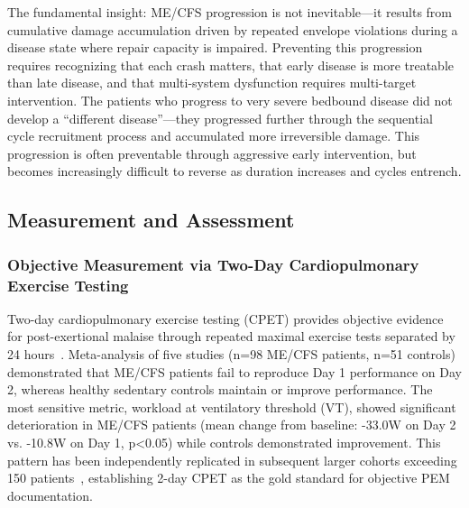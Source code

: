 The fundamental insight: ME/CFS progression is not inevitable---it results from cumulative damage accumulation driven by repeated envelope violations during a disease state where repair capacity is impaired. Preventing this progression requires recognizing that each crash matters, that early disease is more treatable than late disease, and that multi-system dysfunction requires multi-target intervention. The patients who progress to very severe bedbound disease did not develop a ``different disease''---they progressed further through the sequential cycle recruitment process and accumulated more irreversible damage. This progression is often preventable through aggressive early intervention, but becomes increasingly difficult to reverse as duration increases and cycles entrench.

\subsection{Measurement and Assessment}

\subsubsection{Objective Measurement via Two-Day Cardiopulmonary Exercise Testing}

\begin{observation}
\label{obs:2day-cpet}
Two-day cardiopulmonary exercise testing (CPET) provides objective evidence for post-exertional malaise through repeated maximal exercise tests separated by 24 hours~\cite{Lim2020}. Meta-analysis of five studies (n=98 ME/CFS patients, n=51 controls) demonstrated that ME/CFS patients fail to reproduce Day 1 performance on Day 2, whereas healthy sedentary controls maintain or improve performance. The most sensitive metric, workload at ventilatory threshold (VT), showed significant deterioration in ME/CFS patients (mean change from baseline: -33.0W on Day 2 vs. -10.8W on Day 1, p<0.05) while controls demonstrated improvement. This pattern has been independently replicated in subsequent larger cohorts exceeding 150 patients~\cite{keller2024cpet}, establishing 2-day CPET as the gold standard for objective PEM documentation.
\end{observation}

